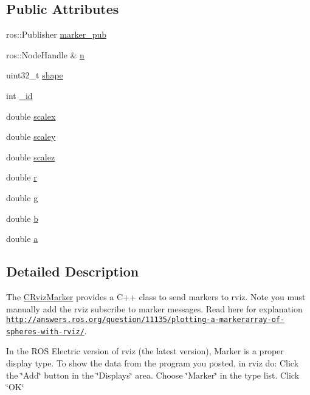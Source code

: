 \subsection*{Public Attributes}
\begin{DoxyCompactItemize}
\item 
ros\-::\-Publisher \hyperlink{classCRvizMarker_a5cc00e270e464a0c3be4a73ebd9f5aaa}{marker\-\_\-pub}
\item 
ros\-::\-Node\-Handle \& \hyperlink{classCRvizMarker_ab77f5a091387abda51f1d523ac4657f9}{n}
\item 
uint32\-\_\-t \hyperlink{classCRvizMarker_ac71ec52d586b80a1f1fd7889871557c7}{shape}
\item 
int \hyperlink{classCRvizMarker_adc420093c48e69c28b80ccc0181faab5}{\-\_\-id}
\item 
double \hyperlink{classCRvizMarker_ac023151b88d7a4c06cee4c33a5f8d06d}{scalex}
\item 
double \hyperlink{classCRvizMarker_a9a20dee09e81974042c0fb7bb3ff1384}{scaley}
\item 
double \hyperlink{classCRvizMarker_ad1c888f2a832cbc9447cd830bb04ae56}{scalez}
\item 
double \hyperlink{classCRvizMarker_af9fab360283313338e57876dfd4f7053}{r}
\item 
double \hyperlink{classCRvizMarker_ad57f170c6e6757617c990c255c28ad3c}{g}
\item 
double \hyperlink{classCRvizMarker_aef6cbf7b2feda8b072863547c9c0719d}{b}
\item 
double \hyperlink{classCRvizMarker_a93c527fccbe4672668b497d5b4976704}{a}
\end{DoxyCompactItemize}


\subsection{Detailed Description}
The \hyperlink{classCRvizMarker}{C\-Rviz\-Marker} provides a C++ class to send markers to rviz. Note you must manually add the rviz subscribe to marker messages. Read here for explanation \href{http://answers.ros.org/question/11135/plotting-a-markerarray-of-spheres-with-rviz/}{\tt http\-://answers.\-ros.\-org/question/11135/plotting-\/a-\/markerarray-\/of-\/spheres-\/with-\/rviz/}. 

In the R\-O\-S Electric version of rviz (the latest version), Marker is a proper display type. To show the data from the program you posted, in rviz do\-: Click the \char`\"{}\-Add\char`\"{} button in the \char`\"{}\-Displays\char`\"{} area. Choose \char`\"{}\-Marker\char`\"{} in the type list. Click \char`\"{}\-O\-K\char`\"{}

